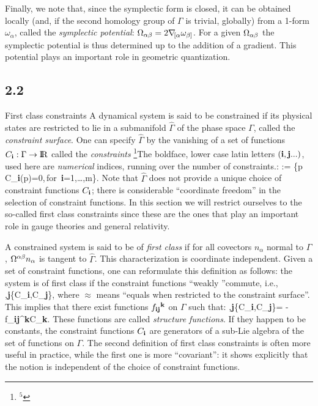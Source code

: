 Finally, we note that, since the symplectic form is closed, it can be obtained
locally (and, if the second homology group of $\Gamma$ is trivial, globally)
from a 1-form $\omega_\alpha$, called the {\it symplectic potential}:
$\Omega_{\alpha\beta}=2\nabla\!_{[\alpha}\omega_{\beta]}$. For a given $\Omega_{{\alpha\beta}}$
the symplectic potential is thus determined up to the addition of a gradient.
This potential plays an important role in geometric quantization.
%
\goodbreak
\subsection{2.2}{First class constraints}
%
A dynamical system is said to be constrained if its physical states are
restricted to lie in a submanifold $\hat\Gamma$ of the phase space $\Gamma$,
called the {\it constraint surface}. One can specify $\hat\Gamma$ by the
vanishing of a set of functions $C_{\bf i}:\Gamma\rightarrow{\rm I\!R}$ called the
{\it constraints}%
\footnote{$^5$}{The boldface, lower case latin letters $({\bf i}, {\bf
j}...)$, used here are {\it numerical} indices, running over the number of
constraints.}:
  \bneq
  \hat\Gamma:= \{p\in\Gamma\,\vert\,C_{\bf i}(p)=0,\,{\rm for}\
  {\bf i}=1,\ldots,m\}.
Note that $\hat\Gamma$ does not provide a unique choice of constraint
functions $C_{\bf i}$; there is considerable ``coordinate freedom'' in
the selection of constraint functions. In this section we will restrict
ourselves to the so-called first class constraints since these are the
ones that play an important role in gauge theories and general relativity.

A constrained system is said to be of {\it first class} if for all covectors
$n_\alpha$ normal to $\hat\Gamma$, $\Omega^{\alpha\beta} n_\alpha$ is tangent to
$\hat\Gamma$. This characterization is coordinate independent. Given a set
of constraint functions, one can reformulate this definition as follows:
the system is of first class if the constraint functions ``weakly ''commute,
i.e.,
\bneq
 ,{\bf j}\qquad\{C_{\bf i},C_{\bf j}\},
where $\approx$ means ``equals when restricted to the constraint surface''.
This implies that there exist functions $f_{{\bf ij}}{}^{\bf k}$ on
$\Gamma$ such that:
\bneq
{},{\bf j}\qquad\{C_{\bf i},C_{\bf j}\}=
 -f_{{\bf ij}}{}^{\bf k}C_{\bf k}.
These functions are called {\it structure functions}. If they happen to be
constants, the constraint functions $C_{\bf i}$ are generators of a sub-Lie
algebra of the set of functions on $\Gamma$. The second definition of first
class constraints is often more useful in practice, while the first one is
more ``covariant'': it shows explicitly that the notion is independent of
the choice of constraint functions.

